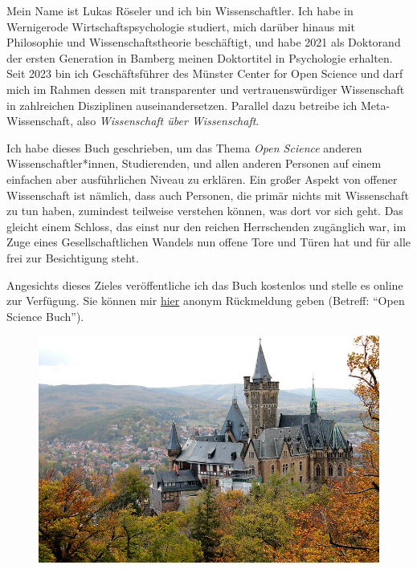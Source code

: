 \documentclass[
  letterpaper,
  DIV=11,
  numbers=noendperiod]{scrreprt}
\begin{document}
\begin{tcolorbox}[enhanced jigsaw, left=2mm, colback=white, colframe=quarto-callout-note-color-frame, opacitybacktitle=0.6, opacityback=0, title=\textcolor{quarto-callout-note-color}{\faInfo}\hspace{0.5em}{Über mich}, toptitle=1mm, coltitle=black, colbacktitle=quarto-callout-note-color!10!white, titlerule=0mm, bottomtitle=1mm, leftrule=.75mm, breakable, rightrule=.15mm, bottomrule=.15mm, toprule=.15mm, arc=.35mm]

Mein Name ist Lukas Röseler und ich bin Wissenschaftler. Ich habe in
Wernigerode Wirtschaftspsychologie studiert, mich darüber hinaus mit
Philosophie und Wissenschaftstheorie beschäftigt, und habe 2021 als
Doktorand der ersten Generation\footnotemark{} in Bamberg meinen
Doktortitel in Psychologie erhalten. Seit 2023 bin ich Geschäftsführer
des Münster Center for Open Science und darf mich im Rahmen dessen mit
transparenter und vertrauenswürdiger Wissenschaft in zahlreichen
Disziplinen auseinandersetzen. Parallel dazu betreibe ich
Meta-Wissenschaft, also \emph{Wissenschaft über Wissenschaft}.

Ich habe dieses Buch geschrieben, um das Thema \emph{Open Science}
anderen Wissenschaftler*innen, Studierenden, und allen anderen Personen
auf einem einfachen aber ausführlichen Niveau zu erklären. Ein großer
Aspekt von offener Wissenschaft ist nämlich, dass auch Personen, die
primär nichts mit Wissenschaft zu tun haben, zumindest teilweise
verstehen können, was dort vor sich geht. Das gleicht einem Schloss, das
einst nur den reichen Herrschenden zugänglich war, im Zuge eines
Gesellschaftlichen Wandels nun offene Tore und Türen hat und für alle
frei zur Besichtigung steht.

Angesichts dieses Zieles veröffentliche ich das Buch kostenlos und
stelle es online zur Verfügung. Sie können mir
\href{https://docs.google.com/forms/d/1Ce4uyr8bRSHZ5yywP3TPdIg8XMLxZqE-mYVL82K6QHI}{hier}
anonym Rückmeldung geben (Betreff: ``Open Science Buch'').

\begin{figure}[H]

{\centering \includegraphics[width=6.25in,height=\textheight]{images/wernigerode.jpg}

}
\end{figure}
\end{tcolorbox}
\end{document}
